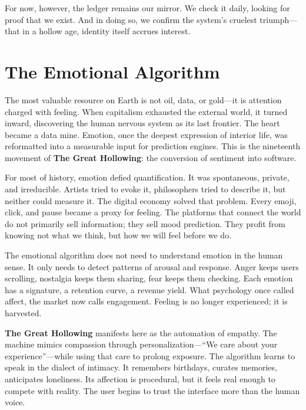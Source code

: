 \documentclass[11pt,twoside]{book}
\begin{document}
For now, however, the ledger remains our mirror.  We check it daily, looking for proof that we exist.  And in doing so, we confirm the system’s cruelest triumph—that in a hollow age, identity itself accrues interest.

%
\chapter{The Emotional Algorithm}
\label{ch:21.}

The most valuable resource on Earth is not oil, data, or gold—it is attention charged with feeling.  
When capitalism exhausted the external world, it turned inward, discovering the human nervous system as its last frontier.  The heart became a data mine.  Emotion, once the deepest expression of interior life, was reformatted into a measurable input for prediction engines.  This is the nineteenth movement of \textbf{The Great Hollowing}: the conversion of sentiment into software.

For most of history, emotion defied quantification.  It was spontaneous, private, and irreducible.  Artists tried to evoke it, philosophers tried to describe it, but neither could measure it.  The digital economy solved that problem.  Every emoji, click, and pause became a proxy for feeling.  The platforms that connect the world do not primarily sell information; they sell mood prediction.  They profit from knowing not what we think, but how we will feel before we do.

The emotional algorithm does not need to understand emotion in the human sense.  It only needs to detect patterns of arousal and response.  Anger keeps users scrolling, nostalgia keeps them sharing, fear keeps them checking.  Each emotion has a signature, a retention curve, a revenue yield.  What psychology once called affect, the market now calls engagement.  Feeling is no longer experienced; it is harvested.

\textbf{The Great Hollowing} manifests here as the automation of empathy.  The machine mimics compassion through personalization—“We care about your experience”—while using that care to prolong exposure.  The algorithm learns to speak in the dialect of intimacy.  It remembers birthdays, curates memories, anticipates loneliness.  Its affection is procedural, but it feels real enough to compete with reality.  The user begins to trust the interface more than the human voice.
\end{document}

